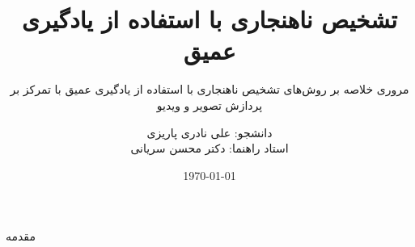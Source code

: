 \documentclass{beamer}
\title{تشخیص ناهنجاری با استفاده از یادگیری عمیق}
\subtitle{مروری خلاصه بر روش‌های تشخیص ناهنجاری با استفاده از یادگیری عمیق با تمرکز بر پردازش تصویر و ویدیو}
\author{دانشجو: علی نادری پاریزی \\ استاد راهنما: دکتر محسن سریانی}
\institute{دانشگاه علم و صنعت ایران}
\date{\today}
\begin{document}
	\begin{frame}
    		\titlepage
	\end{frame}
	\begin{frame}{مقدمه}
	\end{frame}
\end{document}
